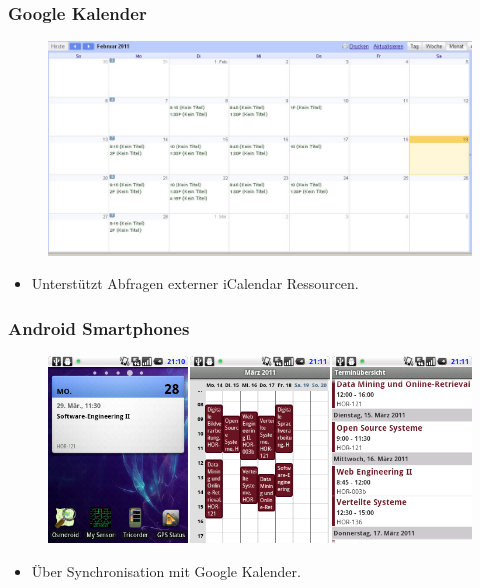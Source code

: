 \documentclass{beamer}
\begin{document}
\begin{frame}\frametitle{Google Kalender}
  \begin{figure}
    \centering
    \includegraphics[height=0.5\paperheight]{images/dhbwcalendar-google.jpg}
  \end{figure}
  \begin{itemize}
    \item Unterstützt Abfragen externer iCalendar Ressourcen.
  \end{itemize}
\end{frame}

\begin{frame}\frametitle{Android Smartphones}
  \begin{figure}
    \centering
    \includegraphics[height=0.5\paperheight]{images/dhbwcalendar-android.png}
  \end{figure}
  \begin{itemize}
    \item Über Synchronisation mit Google Kalender.
  \end{itemize}
\end{frame}
\end{document}
